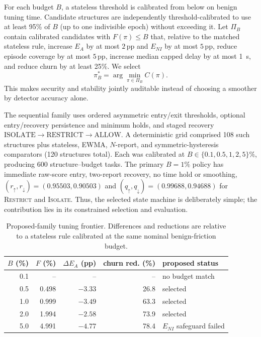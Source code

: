 \documentclass[journal,10pt]{IEEEtran}
\newcommand{\Restrict}{\textsc{Restrict}}
\newcommand{\Isolate}{\textsc{Isolate}}
\newcommand{\pp}{\,\mathrm{pp}}
\begin{document}
For each budget $B$, a stateless threshold is calibrated from below on benign tuning time. Candidate structures are independently threshold-calibrated to use at least 95\% of $B$ (up to one indivisible epoch) without exceeding it. Let $\Pi_B$ contain calibrated candidates with $F(\pi)\leq B$ that, relative to the matched stateless rule, increase $E_A$ by at most $2\pp$ and $E_{NI}$ by at most $5\pp$, reduce episode coverage by at most $5\pp$, increase median capped delay by at most 1~s, and reduce churn by at least 25\%. We select
\begin{equation}
\pi_B^*=\arg\min_{\pi\in\Pi_B} C(\pi).
\label{eq:opt}
\end{equation}
This makes security and stability jointly auditable instead of choosing a smoother by detector accuracy alone.

The sequential family uses ordered asymmetric entry/exit thresholds, optional entry/recovery persistence and minimum holds, and staged recovery $\mathrm{ISOLATE}\!\rightarrow\!\mathrm{RESTRICT}\!\rightarrow\!\mathrm{ALLOW}$. A deterministic grid comprised 108 such structures plus stateless, EWMA, $N$-report, and symmetric-hysteresis comparators (120 structures total). Each was calibrated at $B\in\{0.1,0.5,1,2,5\}\%$, producing 600 structure--budget tasks. The primary $B=1\%$ policy has immediate raw-score entry, two-report recovery, no time hold or smoothing, $(r_\uparrow,r_\downarrow)=(0.95503,0.90503)$ and $(q_\uparrow,q_\downarrow)=(0.99688,0.94688)$ for \Restrict{} and \Isolate{}. Thus, the selected state machine is deliberately simple; the contribution lies in its constrained selection and evaluation.

\begin{table}[t]
\caption{Proposed-family tuning frontier. Differences and reductions are relative to a stateless rule calibrated at the same nominal benign-friction budget.}
\label{tab:frontier}
\centering
\scriptsize
\setlength{\tabcolsep}{3.1pt}
\begin{tabular}{@{}rrrrl@{}}
\toprule
$B$ (\%) & $F$ (\%) & $\Delta E_A$ (pp) & churn red. (\%) & proposed status \\
\midrule
0.1 & --    & --    & --   & no budget match \\
0.5 & 0.498 & $-3.33$ & 26.8 & selected \\
1.0 & 0.999 & $-3.49$ & 63.3 & selected \\
2.0 & 1.994 & $-2.58$ & 73.9 & selected \\
5.0 & 4.991 & $-4.77$ & 78.4 & $E_{NI}$ safeguard failed \\
\bottomrule
\end{tabular}
\end{table}
\end{document}
